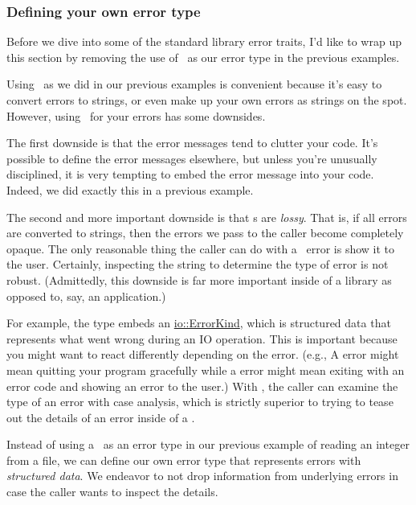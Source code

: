 \subsubsection*{Defining your own error type}

Before we dive into some of the standard library error traits, I'd like to wrap up this section by removing the use of \String\ 
as our error type in the previous examples.

\blank

Using \String\ as we did in our previous examples is convenient because it's easy to convert errors to strings, or even make 
up your own errors as strings on the spot. However, using \String\ for your errors has some downsides.

\blank

The first downside is that the error messages tend to clutter your code. It's possible to define the error messages elsewhere, 
but unless you're unusually disciplined, it is very tempting to embed the error message into your code. Indeed, we did exactly 
this in a previous example.

\blank

The second and more important downside is that \String s are \emph{lossy}. That is, if all errors are converted to strings, 
then the errors we pass to the caller become completely opaque. The only reasonable thing the caller can do with a \String\ 
error is show it to the user. Certainly, inspecting the string to determine the type of error is not robust. (Admittedly, 
this downside is far more important inside of a library as opposed to, say, an application.)

\blank

For example, the  type embeds an \href{https://doc.rust-lang.org/std/io/enum.ErrorKind.html}{io::ErrorKind}, 
which is structured data that represents what went wrong during an IO operation. This is important because you might want to 
react differently depending on the error. (e.g., A \code{BrokenPipe} error might mean quitting your program gracefully while 
a \code{NotFound} error might mean exiting with an error code and showing an error to the user.) With \code{io::ErrorKind}, 
the caller can examine the type of an error with case analysis, which is strictly superior to trying to tease out the details 
of an error inside of a \String.

\blank

Instead of using a \String\ as an error type in our previous example of reading an integer from a file, we can define our 
own error type that represents errors with \emph{structured data}. We endeavor to not drop information from underlying errors 
in case the caller wants to inspect the details.

